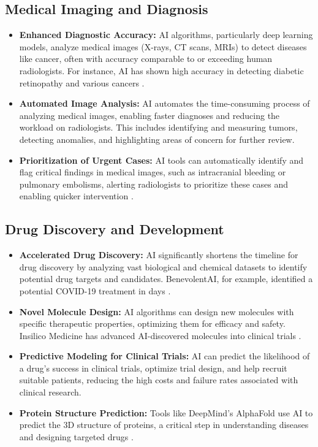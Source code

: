 \subsection{Medical Imaging and Diagnosis}
\begin{itemize}
    \item \textbf{Enhanced Diagnostic Accuracy:} AI algorithms, particularly deep learning models, analyze medical images (X-rays, CT scans, MRIs) to detect diseases like cancer, often with accuracy comparable to or exceeding human radiologists. For instance, AI has shown high accuracy in detecting diabetic retinopathy and various cancers \cite{NIH_Ophthalmology, WhiteRose_Pathology}.
    \item \textbf{Automated Image Analysis:} AI automates the time-consuming process of analyzing medical images, enabling faster diagnoses and reducing the workload on radiologists. This includes identifying and measuring tumors, detecting anomalies, and highlighting areas of concern for further review.
    \item \textbf{Prioritization of Urgent Cases:} AI tools can automatically identify and flag critical findings in medical images, such as intracranial bleeding or pulmonary embolisms, alerting radiologists to prioritize these cases and enabling quicker intervention \cite{Pixeon_MedicalImaging}.
\end{itemize}

\subsection{Drug Discovery and Development}
\begin{itemize}
    \item \textbf{Accelerated Drug Discovery:} AI significantly shortens the timeline for drug discovery by analyzing vast biological and chemical datasets to identify potential drug targets and candidates. BenevolentAI, for example, identified a potential COVID-19 treatment in days \cite{Anablock_Baricitinib}.
    \item \textbf{Novel Molecule Design:} AI algorithms can design new molecules with specific therapeutic properties, optimizing them for efficacy and safety. Insilico Medicine has advanced AI-discovered molecules into clinical trials \cite{Litslink_DrugDiscovery}.
    \item \textbf{Predictive Modeling for Clinical Trials:} AI can predict the likelihood of a drug's success in clinical trials, optimize trial design, and help recruit suitable patients, reducing the high costs and failure rates associated with clinical research.
    \item \textbf{Protein Structure Prediction:} Tools like DeepMind's AlphaFold use AI to predict the 3D structure of proteins, a critical step in understanding diseases and designing targeted drugs \cite{NIH_AlphaFold}.
\end{itemize}

